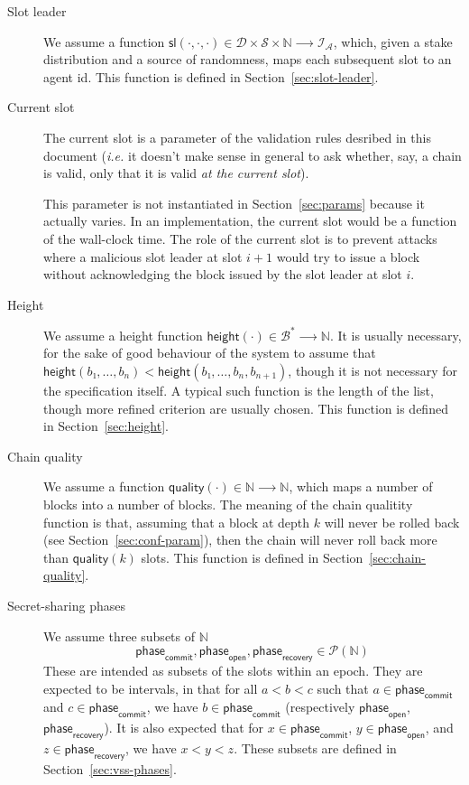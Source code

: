 \documentclass{article}
\newcommand{\powerset}[1]{\mathcal{P}(#1)}
\newcommand{\lists}[1]{{#1}^*}
\newcommand{\idsof}[1]{\mathcal{I}\!_#1}
\newcommand{\blocks}{\mathcal{B}}
\newcommand{\agentids}{\idsof{\mathcal{A}}}
\newcommand{\slotleader}[3]{\mathsf{sl}(#1,#2,#3)}
\newcommand{\stakedistributions}{\mathcal{D}}
\newcommand{\seeds}{\mathcal{S}}
\newcommand{\height}[1]{\mathsf{height}(#1)}
\newcommand{\quality}[1]{\mathsf{quality}(#1)}
\newcommand{\commitphase}{\mathsf{phase}_\mathsf{commit}}
\newcommand{\openphase}{\mathsf{phase}_\mathsf{open}}
\newcommand{\recoveryphase}{\mathsf{phase}_\mathsf{recovery}}
\begin{document}
\begin{description}
\item[Slot leader] We assume a function
  $\slotleader{⋅}{⋅}{⋅} ∈ \stakedistributions×\seeds×ℕ ⟶ \agentids$,
  which, given a stake distribution and a source of randomness, maps
  each subsequent slot to an agent id. This function is defined in
  Section~\ref{sec:slot-leader}.

\item[Current slot] The current slot is a parameter of the validation
  rules desribed in this document (\emph{i.e.} it doesn't make sense
  in general to ask whether, say, a chain is valid, only that it is
  valid \emph{at the current slot}).

  This parameter is not instantiated in Section~\ref{sec:params}
  because it actually varies. In an implementation, the current slot
  would be a function of the wall-clock time. The role of the current
  slot is to prevent attacks where a malicious slot leader at slot
  $i+1$ would try to issue a block without acknowledging the block
  issued by the slot leader at slot $i$.

\item[Height] We assume a height function
  $\height{⋅} ∈ \lists{\blocks} ⟶ ℕ$. It is usually necessary, for the
  sake of good behaviour of the system to assume that
  $\height{b₁,…,b_n} < \height{b₁,…,b_n,b_{n+1}}$, though it is not
  necessary for the specification itself. A typical such function is
  the length of the list, though more refined criterion are usually
  chosen. This function is defined in Section~\ref{sec:height}.

\item[Chain quality] We assume a function $\quality{⋅} ∈ ℕ ⟶ ℕ$, which
  maps a number of blocks into a number of blocks. The meaning of the
  chain qualitity function is that, assuming that a block at depth $k$
  will never be rolled back (see Section~\ref{sec:conf-param}), then
  the chain will never roll back more than $\quality{k}$ slots. This
  function is defined in Section~\ref{sec:chain-quality}.

\item[Secret-sharing phases] We assume three subsets of $ℕ$
  $$
  \commitphase, \openphase, \recoveryphase ∈ \powerset{ℕ}
  $$
  These are intended as subsets of the slots within an epoch. They are
  expected to be intervals, in that for all $a<b<c$ such that
  $a∈\commitphase$ and $c∈\commitphase$, we have $b∈\commitphase$
  (respectively $\openphase$, $\recoveryphase$). It is also expected
  that for $x ∈ \commitphase$, $y∈\openphase$, and $z∈\recoveryphase$,
  we have $x<y<z$. These subsets are defined in
  Section~\ref{sec:vss-phases}.

\end{description}
\end{document}
